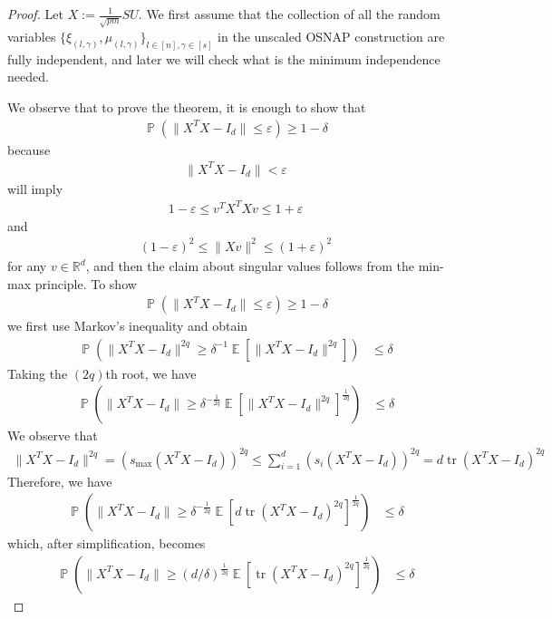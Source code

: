 \documentclass[11pt]{amsart}
\numberwithin{equation}{section}
\numberwithin{equation}{section}
\DeclareMathOperator{\E}{\mathbb{E}}
\DeclareMathOperator{\Pb}{\mathbb{P}}
\DeclareMathOperator*{\tr}{tr}
\theoremstyle{remark}
\theoremstyle{definition}
\begin{document}
    \begin{proof}
    Let $X:= \frac{1}{\sqrt{pm}}SU$. We first assume that the collection of all the random variables 
$\{ \xi_{(l,\gamma)}, \mu_{(l,\gamma)} \}_{l \in [n], \gamma \in [s]}$ 
    in the unscaled OSNAP construction are fully independent, and later we will check what is the minimum independence needed.
    
    We observe that to prove the theorem, it is enough to show that
    \begin{align*} \Pb \left( \| X^TX - I_d \| \le \varepsilon \right) \ge 1-\delta \end{align*}
    because
    \begin{align*} \| X^TX - I_d \| < \varepsilon \end{align*}
    will imply \begin{align*}1 - \varepsilon \leq v^TX^TXv \le 1 + \varepsilon \end{align*} and \begin{align*} (1-\varepsilon)^2 \le \| X v \|^2 \le (1+\varepsilon)^2 \end{align*}
    for any $v \in \mathbb{R}^d$, and then the claim about singular values follows from the min-max principle. To show
    \begin{align*} \Pb \left( \| X^TX - I_d \| \le \varepsilon \right) \ge 1-\delta \end{align*} we first use Markov's inequality and obtain
    \begin{align*}
        \Pb \left( \| X^TX - I_d \|^{2q} \ge \delta^{-1} \E [\| X^TX - I_d \|^{2q}] \right) &\le \delta
    \end{align*}
    Taking the $(2q)$th root, we have
    \begin{align*}
        \Pb \left( \| X^TX - I_d \| \ge \delta^{-\frac{1}{2q}} \E [\| X^TX - I_d \|^{2q}]^{\frac{1}{2q}} \right) &\le \delta
    \end{align*}
We observe that
\begin{align*}
    \| X^TX - I_d \|^{2q} =(s_{\max}(X^TX - I_d))^{2q} \le \sum \limits_{i=1}^d (s_{i}(X^TX - I_d))^{2q} = d \tr (X^TX - I_d)^{2q}
\end{align*}
Therefore, we have
\begin{align*}
        \Pb \left( \| X^TX - I_d \| \ge \delta^{-\frac{1}{2q}} \E [d \tr (X^TX - I_d)^{2q}]^\frac{1}{2q} \right) &\le \delta
    \end{align*}
which, after simplification, becomes
\begin{align*}
        \Pb \left( \| X^TX - I_d \| \ge (d/\delta)^{\frac{1}{2q}} \E [ \tr (X^TX - I_d)^{2q}]^\frac{1}{2q} \right) &\le \delta

\end{align*}
\end{proof}
\end{document}
